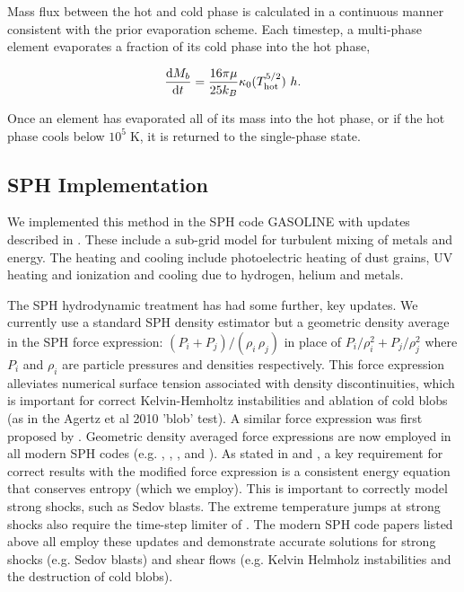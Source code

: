 Mass flux between the hot and cold phase is calculated in a continuous manner
consistent with the prior evaporation scheme.  Each timestep, a multi-phase
element evaporates a fraction of its cold phase into the hot phase,

\begin{equation}\label{multiphase_evaporation}
    \frac{{\rm d}M_b}{{\rm d}t} = \frac{16\pi\mu}{25k_B} \kappa_0 (T_{\rm hot}^{5/2})\ h.
\end{equation}

Once an element has evaporated all of its mass into the hot phase, or if the hot
phase cools below $10^5\;\mathrm{K}$, it is returned to the single-phase state.

\subsection{SPH Implementation}

We implemented this method in the SPH code {\sc GASOLINE}
\citep{Wadsley2004} with updates described in \cite{Shen2010}.  These
include a sub-grid model for turbulent mixing of metals and energy.  The
heating and cooling include photoelectric heating of dust grains, UV heating
and ionization and cooling due to hydrogen, helium and metals.

The SPH hydrodynamic treatment has had some further, key updates.  We currently
use a standard SPH density estimator but a  geometric density average in the SPH
force expression: $(P_i+P_j)/(\rho_i\,\rho_j)$ in place of
$P_i/\rho_i^2+P_j/\rho_j^2$ where $P_i$ and $\rho_i$ are particle pressures and
densities respectively. This force expression alleviates numerical surface
tension associated with density discontinuities, which is important for correct
Kelvin-Hemholtz instabilities and ablation of cold blobs (as in the Agertz et al
2010 'blob' test).  A similar force expression was first proposed by
\citet{Ritchie2001}.  Geometric density averaged force expressions are now
employed in all modern SPH codes (e.g. \cite{Hopkins2013}, \cite{Saitoh2013},
\cite{Kawata2013}, \cite{Hu2014} and \cite{Read2010}).  As
stated in \cite{Read2010} and \cite{Saitoh2013}, a key requirement
for correct results with the modified force expression is a consistent energy
equation that conserves entropy (which we employ).  This is important to
correctly model strong shocks, such as Sedov blasts.  The extreme temperature
jumps at strong shocks also require the time-step limiter of \citet{Saitoh2009}.
The modern SPH code papers listed above all employ these updates and demonstrate
accurate solutions for strong shocks (e.g. Sedov blasts) and shear flows (e.g.
Kelvin Helmholz instabilities and the destruction of cold blobs).

